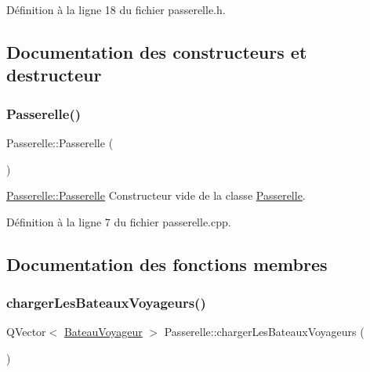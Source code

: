 Définition à la ligne 18 du fichier passerelle.\+h.



\subsection{Documentation des constructeurs et destructeur}
\mbox{\label{class_passerelle_ab70aa7f8273e11735416362091d6c5f4}} 
\subsubsection{\texorpdfstring{Passerelle()}{Passerelle()}}
{\footnotesize\ttfamily Passerelle\+::\+Passerelle (\begin{DoxyParamCaption}{ }\end{DoxyParamCaption})}



\hyperlink{class_passerelle_ab70aa7f8273e11735416362091d6c5f4}{Passerelle\+::\+Passerelle} Constructeur vide de la classe \hyperlink{class_passerelle}{Passerelle}. 



Définition à la ligne 7 du fichier passerelle.\+cpp.



\subsection{Documentation des fonctions membres}
\mbox{\label{class_passerelle_a9f8cdd9d52d668bb33a5380324fb9c51}} 
\subsubsection{\texorpdfstring{charger\+Les\+Bateaux\+Voyageurs()}{chargerLesBateauxVoyageurs()}}
{\footnotesize\ttfamily Q\+Vector$<$ \hyperlink{class_bateau_voyageur}{Bateau\+Voyageur} $>$ Passerelle\+::charger\+Les\+Bateaux\+Voyageurs (\begin{DoxyParamCaption}{ }\end{DoxyParamCaption})\hspace{0.3cm}{\ttfamily [static]}}



